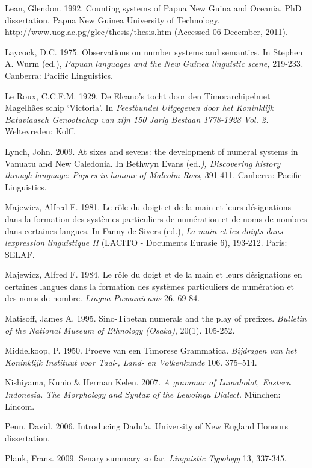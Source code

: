 Lean, Glendon. 1992. Counting systems of Papua New Guina and Oceania. PhD dissertation, Papua New Guinea University of Technology. \url{http://www.uog.ac.pg/glec/thesis/thesis.htm} (Accessed 06 December, 2011).

Laycock, D.C. 1975. Observations on number systems and semantics. In Stephen A. Wurm (ed.), \textit{Papuan languages and the New Guinea linguistic scene, }219-233\textit{. }Canberra: Pacific Linguistics.  

Le Roux, C.C.F.M. 1929. De Elcano{\textquoteright}s tocht door den Timorarchipelmet Magelh\~aes schip {\textquoteleft}Victoria{\textquoteright}. In \textit{Feestbundel Uitgegeven door het Koninklijk Bataviaasch Genootschap van zijn 150 Jarig Bestaan 1778-1928 Vol. 2. }Weltevreden: Kolff.

Lynch, John. 2009. At sixes and sevens: the development of numeral systems in Vanuatu and New Caledonia. In Bethwyn Evans (ed\textit{.), Discovering history through language: Papers in honour of Malcolm Ross}, 391-411. Canberra: Pacific Linguistics.

Majewicz, Alfred F. 1981. Le r\^ole du doigt et de la main et leurs d\'esignations dans la formation des syst\`emes particuliers de num\'eration et de noms de nombres dans certaines langues. In Fanny de Sivers (ed.), \textit{La main et les doigts dans l{\textquotesingle}expression linguistique II} (LACITO - Documents Eurasie 6), 193-212. Paris: SELAF. 

Majewicz, Alfred F. 1984. Le r\^ole du doigt et de la main et leurs d\'esignations en certaines langues dans la formation des syst\`emes particuliers de num\'eration et des noms de nombre. \textit{Lingua Posnaniensis} 26. 69-84.

Matisoff, James A. 1995. Sino-Tibetan numerals and the play of prefixes. \textit{Bulletin of the National Museum of Ethnology (Osaka)}, 20(1). 105-252.

Middelkoop, P. 1950. Proeve van een Timorese Grammatica. \textit{Bijdragen van het} \textit{Koninklijk Instituut voor Taal-, Land- en Volkenkunde }106. 375--514.

Nishiyama, Kunio \& Herman Kelen. 2007. \textit{A grammar of Lamaholot, Eastern Indonesia. The Morphology and Syntax of the Lewoingu Dialect.} M\"unchen: Lincom.

Penn, David. 2006. Introducing Dadu{\textquoteright}a. University of New England Honours dissertation.

Plank, Frans. 2009. Senary summary so far. \textit{Linguistic Typology }13, 337-345. 

